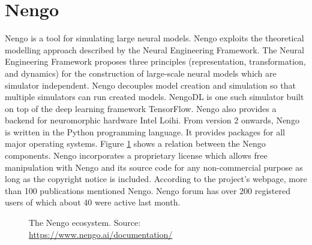 \section{Nengo}

Nengo is a tool for simulating large neural models. Nengo exploits the theoretical modelling approach described by the Neural Engineering Framework. The Neural Engineering Framework proposes three principles (representation, transformation, and dynamics) for the construction of large-scale neural models which are simulator independent. Nengo decouples model creation and simulation so that multiple simulators can run created models. NengoDL is one such simulator built on top of the deep learning framework TensorFlow. Nengo also provides a backend for neuromorphic hardware Intel Loihi. From version 2 onwards, Nengo is written in the Python programming language. It provides packages for all major operating systems. Figure \ref{fig:nengo_ecosystem} shows a relation between the Nengo components. Nengo incorporates a proprietary license which allows free manipulation with Nengo and its source code for any non-commercial purpose as long as the copyright notice is included. According to the project's webpage, more than 100 publications mentioned Nengo. Nengo forum has over 200 registered users of which about 40 were active last month.

\begin{figure}[ht]
    \centering
    
    \caption{The Nengo ecosystem. Source: \url{https://www.nengo.ai/documentation/}}
    \label{fig:nengo_ecosystem}
\end{figure}

